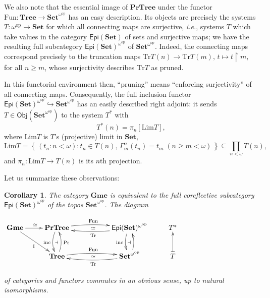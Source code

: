 \documentclass[12pt]{amsart}
\newtheorem{cor}[thm]{Corollary}
\theoremstyle{definition}
\newcommand{\set}[1]{\left\{\, {#1} \,\right\}}
\newcommand{\Obj}[1]{\mathsf{Obj}\left({#1}\right)}
\newcommand{\Sets}{\mathbf{Set}}
\newcommand{\Tree}{\mathbf{Tree}}
\newcommand{\PrTree}{\mathbf{PrTree}}
\newcommand{\Gmes}{\mathbf{Gme}}
\newcommand{\SetNop}{\Sets^{\omega^{\op}}}
\newcommand{\op}{\mathrm{op}}
\begin{document}
\medskip	

We also note that the essential image of $\PrTree$ under the functor $\mathrm{Fun}\colon \Tree \to \SetNop$ has an easy description. Its objects are precisely the systems $T\colon \omega^{\op}\to \Sets$ for which all connecting maps are surjective, \textit{i.e.}, systems $T$ which take values in the category $\mathsf{Epi}(\Sets)$ of sets and surjective maps; we have the resulting full subcategory  $\mathsf{Epi}(\Sets)^{\omega^{\op}}$ of $\SetNop$.
Indeed, the connecting maps correspond precisely to the truncation maps $\mathrm{Tr}T(n)\to \mathrm{Tr}T(m),\, t\mapsto t\upharpoonright m,$ for all $n\geq m$, whose surjectivity describes $\mathrm{Tr}T$ as pruned. 

In this functorial environment then, ``pruning'' means ``enforcing surjectivity'' of all connecting maps. Consequently, the full inclusion functor $\mathsf{Epi}(\Sets)^{\omega^{\op}}	\hookrightarrow{\SetNop}$ has an easily described right adjoint:  it sends $T\in \Obj{{\SetNop}}$ to the system $T^*$ with
\[
T^\ast(n) =\pi_n[\mathrm{Lim}T],
\]
where $\mathrm{Lim}T$ is $T$'s (projective) limit in $\Sets$,
\[
\mathrm{Lim}T =\set{(t_n:n<\omega):t_n\in T(n),\, \Gamma^n_m(t_n)=t_m \;(n\geq m<\omega)}\subseteq \prod_{n<\omega}T(n),
\] 
and $\pi_n\colon \mathrm{Lim}T\to T(n)$ is its $n$th projection.

Let us summarize these observations:

\begin{cor}\label{COR_Tree_SetNop}
	The category $\Gmes$ is equivalent to the full coreflective subcategory  $\mathsf{Epi}(\Sets)^{\omega^{\op}}$ of the topos		$\SetNop$. The diagram 
	\begin{center}
		$\xymatrix{\Gmes\ar[r]^{\simeq\;}\ar[rd]_{\mathrm{I}} & \PrTree\ar@/_0.5pc/[d]^{\dashv}_{\mathrm{inc}}\ar@/^0.4pc/[rr]^{\mathrm{Fun}} && \mathsf{Epi}(\Sets)^{\omega^{\op}}\ar@/_0.5pc/[d]^{\dashv}_{\mathrm{inc}}\ar@/^0.4pc/[ll]_{\simeq}^{\mathrm{Tr}} & T^*\\
			& \Tree\ar@/_0.5pc/[u]_{\mathrm{Pr}}\ar@/^0.4pc/[rr]^{\mathrm{Fun}} && \SetNop\ar@/_0.5pc/[u]\ar@/^0.4pc/[ll]_{\simeq}^{\mathrm{Tr}} & T\ar@{|->}[u] \\	
		}$
	\end{center}	
	of categories and functors commutes in an obvious sense, up to natural isomorphisms.
\end{cor}
\end{document}
